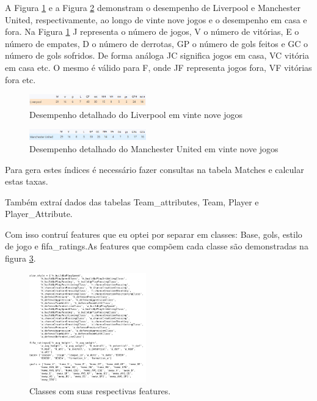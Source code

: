 \documentclass{article}
\begin{document}
A Figura \ref{fig:Liv_rodada29} e a Figura \ref{fig:ManUtd_rodada29} demonstram o desempenho de Liverpool e Manchester United, respectivamente, ao longo de vinte nove jogos e o desempenho em casa e fora.
Na Figura \ref{fig:Liv_rodada29} J representa o número de jogos, V o número de vitórias, E o número de empates, D o número de derrotas, GP o número de gols feitos e GC o número de gols sofridos. De forma análoga JC significa jogos em casa, VC vitória em casa etc. O mesmo é válido para F, onde JF representa jogos fora, VF vitórias fora etc.

\begin{figure}[!h]
	\centering
	\includegraphics[width=0.45\textwidth]{./04-figuras/Liverpool_30.png}
	\caption{Desempenho detalhado do Liverpool em vinte nove jogos}
	\label{fig:Liv_rodada29}
\end{figure}

\begin{figure}[!h]
	\centering
	\includegraphics[width=0.45\textwidth]{./04-figuras/ManUtd_30.png}
	\caption{Desempenho detalhado do Manchester United em vinte nove jogos}
	\label{fig:ManUtd_rodada29}
\end{figure}

Para gera estes índices é necessário fazer consultas na tabela Matches e calcular estas taxas.

Também extraí dados das tabelas Team\_attributes, Team, Player e Player\_Attribute.  

Com isso contruí features que eu optei por separar em classes: Base, gols, estilo de jogo e fifa\_ratings.As features que compõem cada classe são demonstradas na figura \ref{fig:class_features}.

\begin{figure}[!h]
	\centering
	\includegraphics[width=0.45\textwidth]{./04-figuras/features_class.png}
	\caption{Classes com suas respectivas features.}
	\label{fig:class_features}
\end{figure}
\end{document}
